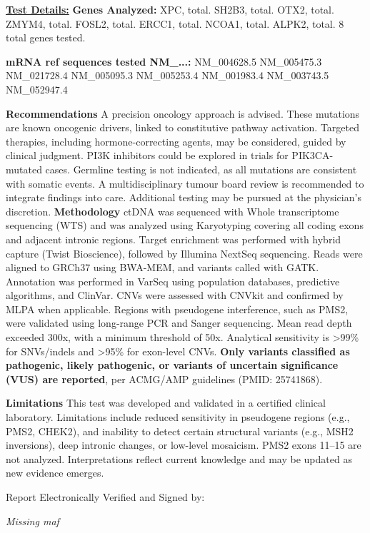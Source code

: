 \documentclass[11pt]{extarticle}
\begin{document}
{\huge \bf \underline{Test Details:}} \newline
\newline
{\bf \Large Genes Analyzed: } XPC, total. SH2B3, total. OTX2, total. ZMYM4, total. FOSL2, total. ERCC1, total. NCOA1, total. ALPK2, total.  
8 total genes tested. 

{\bf \large mRNA ref sequences tested NM_...:}
NM\_004628.5 NM\_005475.3 NM\_021728.4 NM\_005095.3 NM\_005253.4 NM\_001983.4 NM\_003743.5 NM\_052947.4 

\newline \newline
{\Large \bf Recommendations \newline}
A precision oncology approach is advised. These mutations are known oncogenic drivers, linked to constitutive pathway activation. Targeted therapies, including hormone-correcting agents, may be considered, guided by clinical judgment. PI3K inhibitors could be explored in trials for PIK3CA-mutated cases. Germline testing is not indicated, as all mutations are consistent with somatic events. A multidisciplinary tumour board review is recommended to integrate findings into care. Additional testing may be pursued at the physician’s discretion. 
\newline 
\newline
{\Large \bf Methodology \newline}
ctDNA was sequenced with Whole transcriptome sequencing (WTS) and was analyzed using Karyotyping covering all coding exons and adjacent intronic regions. Target enrichment was performed with hybrid capture (Twist Bioscience), followed by Illumina NextSeq sequencing. Reads were aligned to GRCh37 using BWA-MEM, and variants called with GATK. Annotation was performed in VarSeq using population databases, predictive algorithms, and ClinVar. CNVs were assessed with CNVkit and confirmed by MLPA when applicable. Regions with pseudogene interference, such as PMS2, were validated using long-range PCR and Sanger sequencing. Mean read depth exceeded 300x, with a minimum threshold of 50x. Analytical sensitivity is >99\% for SNVs/indels and >95\% for exon-level CNVs. {\bf Only variants classified as pathogenic, likely pathogenic, or variants of uncertain significance (VUS) are reported}, per ACMG/AMP guidelines (PMID: 25741868).

{\Large \bf Limitations \newline}
This test was developed and validated in a certified clinical laboratory. Limitations include reduced sensitivity in pseudogene regions (e.g., PMS2, CHEK2), and inability to detect certain structural variants (e.g., MSH2 inversions), deep intronic changes, or low-level mosaicism. PMS2 exons 11–15 are not analyzed. Interpretations reflect current knowledge and may be updated as new evidence emerges.

\newpage
{\huge Report Electronically Verified and Signed by: }

\it{Missing} maf
\end{document}
